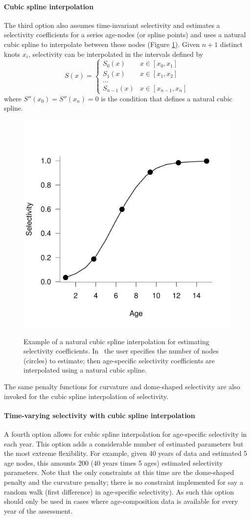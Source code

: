 \paragraph{Cubic spline interpolation}
The third option also assumes time-invariant selectivity and estimates a selectivity coefficients for a series age-nodes (or spline points) and uses a natural cubic spline to interpolate between these nodes (Figure \ref{Fig2}). Given $n+1$ distinct knots $x_i$, selectivity can be interpolated in the intervals defined by
\[
S(x) = \begin{cases}
	S_0(x) & x \in [x_0,x_1]\\
	S_1(x) & x \in [x_1,x_2]\\
	...\\
	S_{n-1}(x) & x \in [x_{n-1},x_n]
\end{cases}
\]
where  $S''(x_0) = S''(x_n)=0$  is the condition that defines a natural cubic spline.
\begin{figure}
	\centering
	\includegraphics[width=0.4\columnwidth]{Figs/SplineEg.pdf}\\
	\caption{Example of a natural cubic spline interpolation for estimating selectivity coefficients.  In \iscam\ the user specifies the number of nodes (circles) to estimate; then age-specific selectivity coefficients are interpolated using a natural cubic spline.}\label{Fig2}
\end{figure}

The same penalty functions for curvature and dome-shaped selectivity are also invoked for the cubic spline interpolation of selectivity.

\paragraph{Time-varying selectivity with cubic spline interpolation} A fourth option allows for cubic spline interpolation for age-specific selectivity  in each year.  This option adds a considerable number of estimated parameters but the most extreme flexibility.  For example, given 40 years of data and estimated 5 age nodes, this amounts 200 (40 years times 5 ages) estimated selectivity parameters.  Note that the only constraints at this time are the dome-shaped penalty and the curvature penalty; there is no constraint implemented for say a random walk (first difference) in age-specific selectivity).  As such this option should only be used in cases where age-composition data is available for every year of the assessment.

